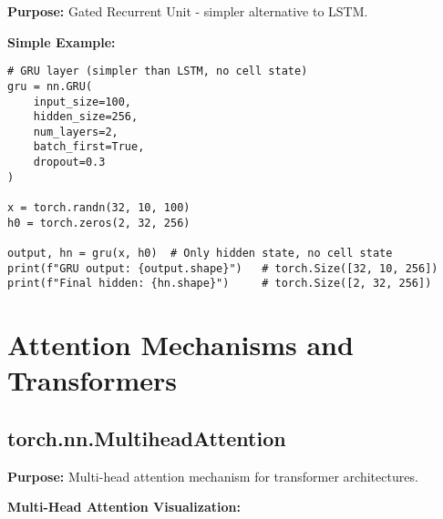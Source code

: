 \documentclass[11pt,a4paper]{book}
\begin{document}
\textbf{Purpose:} Gated Recurrent Unit - simpler alternative to LSTM.

\textbf{Simple Example:}
\begin{verbatim}
# GRU layer (simpler than LSTM, no cell state)
gru = nn.GRU(
    input_size=100,
    hidden_size=256,
    num_layers=2,
    batch_first=True,
    dropout=0.3
)

x = torch.randn(32, 10, 100)
h0 = torch.zeros(2, 32, 256)

output, hn = gru(x, h0)  # Only hidden state, no cell state
print(f"GRU output: {output.shape}")   # torch.Size([32, 10, 256])
print(f"Final hidden: {hn.shape}")     # torch.Size([2, 32, 256])
\end{verbatim}

\section{Attention Mechanisms and Transformers}

\subsection{torch.nn.MultiheadAttention}

\textbf{Purpose:} Multi-head attention mechanism for transformer architectures.

\textbf{Multi-Head Attention Visualization:}
\end{document}
